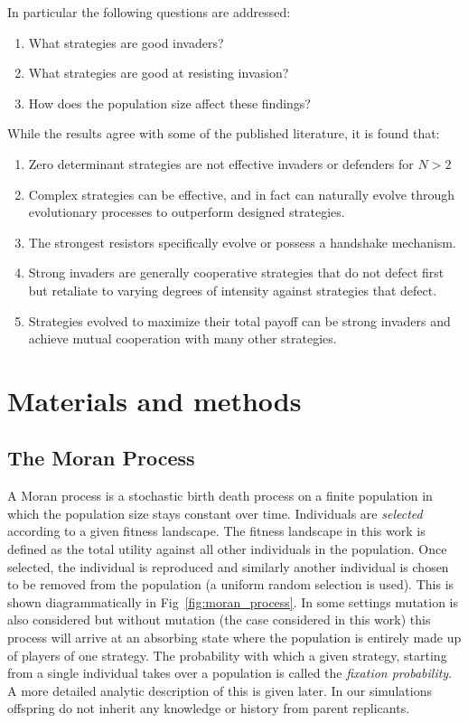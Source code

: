 \documentclass[10pt,letterpaper]{article}
\begin{document}
In particular the following questions are addressed:
\begin{enumerate}
    \item What strategies are good invaders?
    \item What strategies are good at resisting invasion?
    \item How does the population size affect these findings?
\end{enumerate}

While the results agree with some of the published literature, it is found that:

\begin{enumerate}
 \item Zero determinant strategies are not effective invaders or defenders for $N > 2$
 \item Complex strategies can be effective, and in fact can naturally evolve
     through evolutionary processes to outperform designed strategies.
 \item The strongest resistors specifically evolve or possess a handshake mechanism.
 \item Strong invaders are generally cooperative strategies that do not defect
 first but retaliate to varying degrees of intensity against strategies that defect.
 \item Strategies evolved to maximize their total payoff can be strong invaders
 and achieve mutual cooperation with many other strategies.
\end{enumerate}

\section*{Materials and methods}
\subsection*{The Moran Process}

A Moran process is a stochastic birth death process on a finite population in which the
population size stays constant over time. Individuals are \textit{selected}
according to a given fitness landscape. The fitness landscape in this work is
defined as the total utility against all other individuals in the population.
Once selected, the individual
is reproduced and similarly another individual is chosen to be removed from the
population (a uniform random selection is used). This is shown diagrammatically
in Fig~\ref{fig:moran_process}. In some settings mutation is
also considered but without mutation (the case considered in this work) this
process will arrive at an absorbing state where the population is entirely made
up of players of one strategy. The probability with which a given strategy,
starting from a single individual takes
over a population is called the \textit{fixation probability}. A more detailed
analytic description of this is given later. In our
simulations offspring do not inherit any knowledge or history from parent
replicants.
\end{document}
